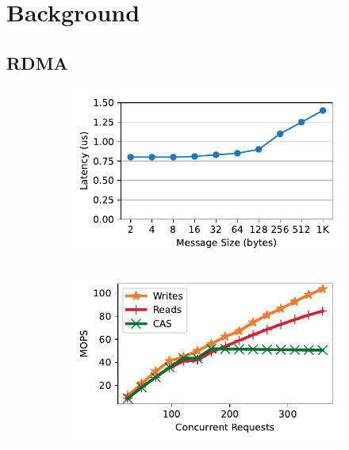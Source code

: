 \section{Background}
\label{sec:background}

\subsection{RDMA}


\begin{figure}[t]
    \centering
    \begin{subfigure}{0.3\linewidth}
        \includegraphics[width=0.99\linewidth]{fig/rdma_latency.pdf}
    \end{subfigure}
    \begin{subfigure}{0.3\linewidth}
        \includegraphics[width=0.99\linewidth]{fig/rdma_concur.pdf}

\end{subfigure}
\end{figure}
